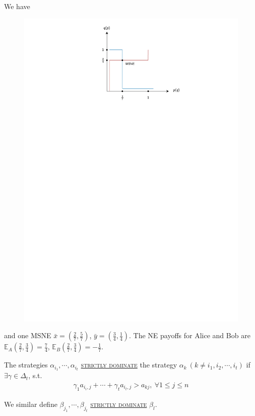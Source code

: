 We have
\begin{figure}[H]
    \centering
    \includegraphics[width = \textwidth, trim = {4cm, 21cm, 3cm, 0cm}, clip]{document/0416.drawio.pdf}
\end{figure}
and one MSNE $\bar{x} = (\frac{2}{7}, \frac{5}{7})$, $\bar{y} = (\frac{3}{4}, \frac{1}{4})$. The NE payoffs for Alice and Bob are $\mathbb{E}_A(\frac{2}{7}, \frac{3}{4}) = \frac{7}{4}$, $\mathbb{E}_B(\frac{2}{7}, \frac{3}{4}) = -\frac{1}{7}$.

\begin{definition}
    The strategies $\alpha_{i_1}, \cdots, \alpha_{i_t}$ \uline{\textcolor{MarkerColour}{\textsc{strictly dominate}}} the strategy $\alpha_k\ (k\neq i_1, i_2, \cdots, i_t)$ if $\exists \gamma\in\Delta_t$, s.t. 
    \begin{align*}
        \gamma_1a_{i_i, j} + \cdots + \gamma_{t} a_{i_t, j} > a_{kj}, \ \forall 1\leqslant j\leqslant n
    \end{align*}

    We similar define $\beta_{j_1}, \cdots, \beta_{j_t}$ \uline{\textcolor{MarkerColour}{\textsc{strictly dominate}}} $\beta_l$.
\end{definition}


